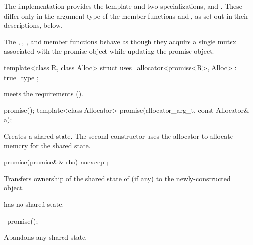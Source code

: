 \pnum
The implementation provides the template  and two specializations,
 and . These differ only in the argument type
of the member functions  and ,
as set out in their descriptions, below.

\pnum
The , , ,
and  member functions behave as though
they acquire a single mutex associated with the promise object while updating the
promise object.

%
\begin{itemdecl}
template<class R, class Alloc>
  struct uses_allocator<promise<R>, Alloc>
    : true_type { };
\end{itemdecl}

\begin{itemdescr}
\pnum
\expects
{} meets the 
requirements ().
\end{itemdescr}

%
\begin{itemdecl}
promise();
template<class Allocator>
  promise(allocator_arg_t, const Allocator& a);
\end{itemdecl}

\begin{itemdescr}
\pnum
\effects
Creates a shared state. The second
constructor uses the allocator  to allocate memory for the shared
state.
\end{itemdescr}

%
\begin{itemdecl}
promise(promise&& rhs) noexcept;
\end{itemdecl}

\begin{itemdescr}
\pnum
\effects
Transfers ownership of the shared state
of  (if any) to the newly-constructed object.

\pnum
\ensures
{} has no shared state.
\end{itemdescr}

%
\begin{itemdecl}
~promise();
\end{itemdecl}

\begin{itemdescr}
\pnum
\effects
Abandons any shared state.
\end{itemdescr}

